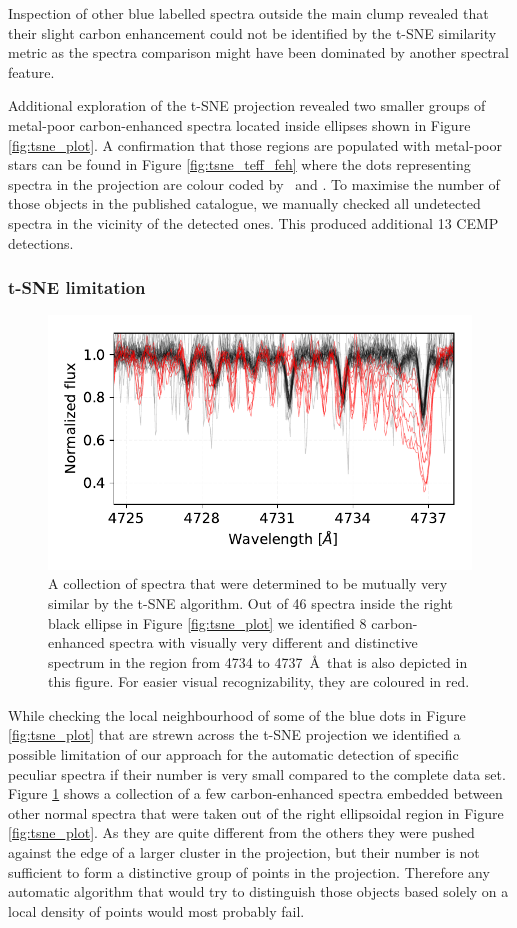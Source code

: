 Inspection of other blue labelled spectra outside the main clump revealed that their slight carbon enhancement could not be identified by the t-SNE similarity metric as the spectra comparison might have been dominated by another spectral feature.

Additional exploration of the t-SNE projection revealed two smaller groups of metal-poor carbon-enhanced spectra located inside ellipses shown in Figure \ref{fig:tsne_plot}. A confirmation that those regions are populated with metal-poor stars can be found in Figure \ref{fig:tsne_teff_feh} where the dots representing spectra in the projection are colour coded by \Feh\ and \Teff. To maximise the number of those objects in the published catalogue, we manually checked all undetected spectra in the vicinity of the detected ones. This produced additional 13 CEMP detections.

\subsubsection{t-SNE limitation}
\begin{figure}
	\centering
	\includegraphics[width=\columnwidth]{tsne_cemp.pdf}
	\caption{A collection of spectra that were determined to be mutually very similar by the t-SNE algorithm. Out of 46 spectra inside the right black ellipse in Figure \ref{fig:tsne_plot} we identified 8 carbon-enhanced spectra with visually very different and distinctive spectrum in the region from 4734 to 4737~\AA\ that is also depicted in this figure. For easier visual recognizability, they are coloured in red.}
	\label{fig:tsne_cemps}
\end{figure}
While checking the local neighbourhood of some of the blue dots in Figure \ref{fig:tsne_plot} that are strewn across the t-SNE projection we identified a possible limitation of our approach for the automatic detection of specific peculiar spectra if their number is very small compared to the complete data set. Figure \ref{fig:tsne_cemps} shows a collection of a few carbon-enhanced spectra embedded between other normal spectra that were taken out of the right ellipsoidal region in Figure \ref{fig:tsne_plot}. As they are quite different from the others they were pushed against the edge of a larger cluster in the projection, but their number is not sufficient to form a distinctive group of points in the projection. Therefore any automatic algorithm that would try to distinguish those objects based solely on a local density of points would most probably fail.

